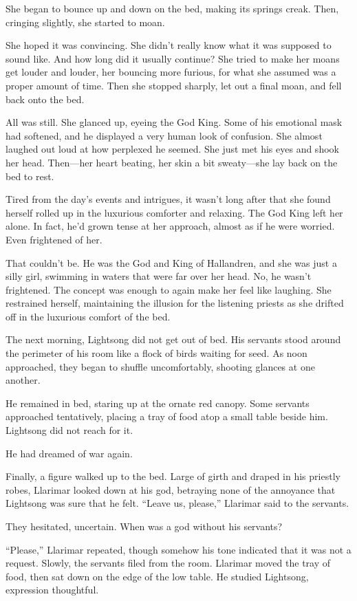 She began to bounce up and down on the bed, making its springs creak. Then, cringing slightly, she started to moan.

She hoped it was convincing. She didn’t really know what it was supposed to sound like. And how long did it usually continue? She tried to make her moans get louder and louder, her bouncing more furious, for what she assumed was a proper amount of time. Then she stopped sharply, let out a final moan, and fell back onto the bed.

All was still. She glanced up, eyeing the God King. Some of his emotional mask had softened, and he displayed a very human look of confusion. She almost laughed out loud at how perplexed he seemed. She just met his eyes and shook her head. Then—her heart beating, her skin a bit sweaty—she lay back on the bed to rest.

Tired from the day’s events and intrigues, it wasn’t long after that she found herself rolled up in the luxurious comforter and relaxing. The God King left her alone. In fact, he’d grown tense at her approach, almost as if he were worried. Even frightened of her.

That couldn’t be. He was the God and King of Hallandren, and she was just a silly girl, swimming in waters that were far over her head. No, he wasn’t frightened. The concept was enough to again make her feel like laughing. She restrained herself, maintaining the illusion for the listening priests as she drifted off in the luxurious comfort of the bed.

\orn

The next morning, Lightsong did not get out of bed. His servants stood around the perimeter of his room like a flock of birds waiting for seed. As noon approached, they began to shuffle uncomfortably, shooting glances at one another.

He remained in bed, staring up at the ornate red canopy. Some servants approached tentatively, placing a tray of food atop a small table beside him. Lightsong did not reach for it.

He had dreamed of war again.

Finally, a figure walked up to the bed. Large of girth and draped in his priestly robes, Llarimar looked down at his god, betraying none of the annoyance that Lightsong was sure that he felt. “Leave us, please,” Llarimar said to the servants.

They hesitated, uncertain. When was a god without his servants?

“Please,” Llarimar repeated, though somehow his tone indicated that it was not a request. Slowly, the servants filed from the room. Llarimar moved the tray of food, then sat down on the edge of the low table. He studied Lightsong, expression thoughtful.

